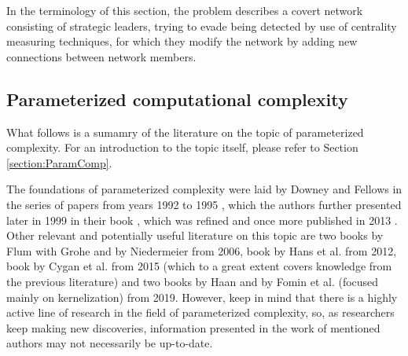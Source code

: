 In the terminology of this section, the \HL problem describes a covert network consisting of strategic leaders, trying to
evade being detected by use of centrality measuring techniques,
for which they modify the network by adding new connections between network members. 

\subsection{Parameterized computational complexity}

What follows is a sumamry of the literature on the topic of parameterized complexity.
For an introduction to the topic itself, please refer to Section \ref{section:ParamComp}.

The foundations of parameterized complexity were laid by Downey and Fellows
in the series of papers from years 1992 to 1995 \cite{Downey1992,Downey1995.1,Downey1995.2,Downey1993,Downey1995.4},
which the authors further presented later in 1999 in their book \cite{Downey1999},
which was refined and once more published in 2013 \cite{Downey2013}.
Other relevant and potentially useful literature on this topic are
two books by Flum with Grohe \cite{Flum2006} and by Niedermeier \cite{Niedermeier2006} from 2006, book by Hans et al. \cite{Hans2012} from 2012,
book by Cygan et al. \cite{Cygan2015} from 2015 (which to a great extent covers knowledge from the previous literature)
and two books by Haan \cite{Haan2019} and by Fomin et al. (focused mainly on kernelization) \cite{Fomin2019} from 2019.
However, keep in mind that there is a highly active line of research in the field of parameterized complexity, so,
as researchers keep making new discoveries, information presented in the work of mentioned authors may not necessarily be up-to-date.
